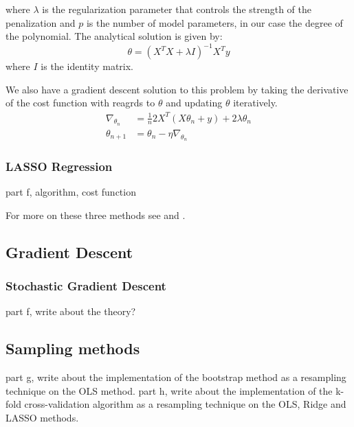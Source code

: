 \documentclass[amssymb,twocolumn,aps]{revtex4}
\begin{document}
where $\lambda$ is the regularization parameter that controls the strength of the penalization and $p$ is the number of model parameters, in our case the degree of the polynomial.
The analytical solution is given by:
\begin{equation}
\theta = (X^TX + \lambda I)^{-1}X^Ty
\end{equation}
where $I$ is the identity matrix.

We also have a gradient descent solution to this problem by taking the derivative of the cost function with reagrds to $\theta$ and updating $\theta$ iteratively.
\begin{align}
\nabla_{\theta_n} &= \frac{1}{n}2X^T(X\theta_n + y) + 2\lambda \theta_n \\
\theta_{n+1} &= \theta_n - \eta \nabla_{\theta_n}
\end{align}

\subsubsection{LASSO Regression}
part f, algorithm, cost function

For more on these three methods see \cite{compfys} and \cite{hastie}.

\subsection{Gradient Descent}

\subsubsection{Stochastic Gradient Descent}
part f, write about the theory?


\subsection{Sampling methods}
part g, write about the implementation of the bootstrap method as a resampling technique on the OLS method.
part h, write about the implementation of the k-fold cross-validation algorithm as a resampling technique on the OLS, Ridge and LASSO methods.

\end{document}
